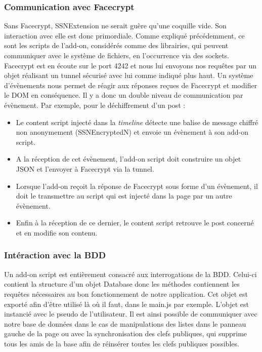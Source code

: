 \documentclass[a4paper,11pt,french]{article}
\begin{document}
\subsubsection{Communication avec Facecrypt}
Sans Facecrypt, SSNExtension ne serait guère qu'une coquille vide. Son interaction
avec elle est donc primordiale. Comme expliqué précédemment, ce sont les scripts de
l'add-on, considérés comme des librairies, qui peuvent communiquer avec le système de
fichiers, en l'occurrence via des sockets. Facecrypt est en écoute sur le port 4242
et nous lui envoyons nos requêtes par un objet réalisant un tunnel sécurisé avec lui
comme indiqué plus haut. Un système d'évènements nous permet de réagir aux réponses
reçues de Facecrypt et modifier le DOM en conséquence. Il y a donc un double niveau
de communication par évènement. Par exemple, pour le déchiffrement d'un post :
\begin{itemize}
\item Le content script injecté dans la \emph{timeline} détecte une balise de message
chiffré non anonymement (SSNEncryptedN) et envoie un évènement à son add-on script.
\item A la réception de cet évènement, l'add-on script doit construire un objet JSON
et l'envoyer à Facecrypt via la tunnel.
\item Lorsque l'add-on reçoit la réponse de Facecrypt sous forme d'un 
évènement, il doit le transmettre au script qui est injecté dans la page par un autre
évènement.
\item Enfin à la réception de ce dernier, le content script retrouve le post concerné
et en modifie son contenu.
\end{itemize}

\subsubsection{Intéraction avec la BDD}
Un add-on script est entièrement consacré aux interrogations de la BDD. Celui-ci 
contient la structure d'un objet Database donc les méthodes contiennent les requêtes
nécessaires au bon fonctionnement de notre application. Cet objet est exporté afin
d'être utilisé là où il faut, dans le main.js par exemple. L'objet est instancié 
avec le pseudo de l'utilisateur. Il est ainsi possible de communiquer avec notre base
de données dans le cas de manipulations des listes dans le panneau gauche de la page
ou avec la synchronisation des clefs publiques, qui supprime tous les amis de la base
afin de réinsérer toutes les clefs publiques possibles.
\end{document}
